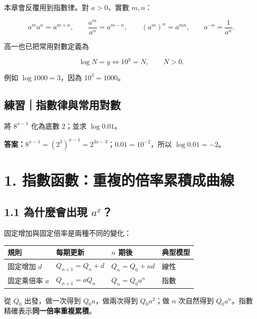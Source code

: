 \documentclass[11pt,a4paper]{article}
\newcounter{none}
\begin{document}
本章會反覆用到指數律。對 \(a>0\)、實數 \(m,n\)：

\[
a^m a^n=a^{m+n},\qquad
\frac{a^m}{a^n}=a^{m-n},\qquad
(a^m)^n=a^{mn},\qquad
a^{-n}=\frac1{a^n}.
\]

高一也已把常用對數定義為

\[
\boxed{\log N=y\iff 10^y=N},\qquad N>0.
\]

例如 \(\log1000=3\)，因為 \(10^3=1000\)。

\begin{HandoutSelfCheck}

\subsection{練習｜指數律與常用對數}\label{ux7df4ux7fd2ux6307ux6578ux5f8bux8207ux5e38ux7528ux5c0dux6578}

將 \(8^{x-1}\) 化為底數 \(2\)；並求 \(\log0.01\)。

\textbf{答案：}\(8^{x-1}=(2^3)^{x-1}=2^{3x-3}\)；\(0.01=10^{-2}\)，所以 \(\log0.01=-2\)。

\end{HandoutSelfCheck}

\section{1. 指數函數：重複的倍率累積成曲線}\label{ux6307ux6578ux51fdux6578ux91cdux8907ux7684ux500dux7387ux7d2fux7a4dux6210ux66f2ux7dda}

\subsection{\texorpdfstring{1.1 為什麼會出現 \(a^x\)？}{1.1 為什麼會出現 a\^{}x？}}\label{ux70baux4ec0ux9ebcux6703ux51faux73fe-ax}

固定增加與固定倍率是兩種不同的變化：

{\def\LTcaptype{none} %
\begin{longtable}[]{@{}llll@{}}
\toprule\noalign{}
規則 & 每期更新 & \(n\) 期後 & 典型模型 \\
\midrule\noalign{}
\endhead
\bottomrule\noalign{}
\endlastfoot
固定增加 \(d\) & \(Q_{n+1}=Q_n+d\) & \(Q_n=Q_0+nd\) & 線性 \\
固定乘倍率 \(a\) & \(Q_{n+1}=aQ_n\) & \(Q_n=Q_0a^n\) & 指數 \\
\end{longtable}
}

從 \(Q_0\) 出發，做一次得到 \(Q_0a\)，做兩次得到 \(Q_0a^2\)；做 \(n\) 次自然得到 \(Q_0a^n\)。指數精確表示\textbf{同一倍率重複累積}。
\end{document}
